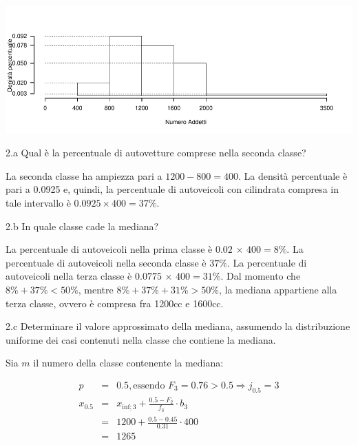 \documentclass[
  11pt,
]{book}
\theoremstyle{mytheoremstyle}
\theoremstyle{mydefstyle}
\newenvironment{sol}
  {
  \begin{tcolorbox}[enhanced,breakable,arc=0.1mm,boxrule=1pt,colback=white,colframe=iblue,
  title=\bf \fontfamily{lmss}\selectfont \hspace{.5 cm} Soluzione,drop fuzzy shadow]

}{
\end{tcolorbox}
  }
\begin{document}
\begin{center}\includegraphics{Esami_passati_con_soluzioni_files/figure-latex/01-descr-18-1} \end{center}

2.a Qual è la percentuale di autovetture comprese nella seconda classe?

\begin{sol}
La seconda classe ha ampiezza pari a \(1200 - 800 = 400\).
La densità percentuale è pari a 0.0925 e, quindi, la
percentuale di autoveicoli con cilindrata compresa in tale
intervallo è \(0.0925 \times 400 = 37\%\).

\end{sol}

2.b In quale classe cade la mediana?

\begin{sol}
La percentuale di autoveicoli nella prima classe è
\(0.02 \,\times\, 400 = 8\%\).
La percentuale di autoveicoli nella seconda classe è \(37\%\).
La percentuale di autoveicoli nella terza classe è
\(0.0775 \,\times\, 400 = 31\%\).
Dal momento che \(8\% +37\% < 50\%\), mentre
\(8\% +37\% +31\% > 50\%\), la mediana appartiene
alla terza classe, ovvero è compresa fra 1200cc e 1600cc.

\end{sol}

2.c Determinare il valore approssimato della mediana,
assumendo la distribuzione uniforme dei casi contenuti
nella classe che contiene la mediana.

\begin{sol}
Sia \(m\) il numero della classe contenente la mediana:

\begin{eqnarray*}
  p &=&  0.5 , \text{essendo }F_{ 3 }= 0.76  > 0.5  \Rightarrow j_{ 0.5 }= 3 \\
  x_{ 0.5 } &=& x_{\text{inf}; 3 } + \frac{ { 0.5 } - F_{ 2 }} {f_{ 3 }} \cdot b_{ 3 } \\
            &=&  1200  + \frac {{ 0.5 } -  0.45 } { 0.31 } \cdot  400  \\
            &=&  1265 
\end{eqnarray*}

\end{sol}
\end{document}
